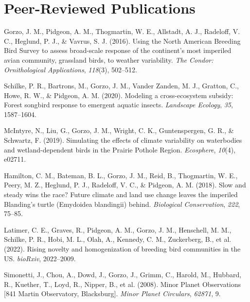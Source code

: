 \documentclass[11pt,a4paper,]{awesome-cv}
\newlength{\cslhangindent}
\newenvironment{CSLReferences}[2] %
 {\begin{list}{}{%
  \setlength{\itemindent}{0pt}
  \setlength{\leftmargin}{0pt}
  \setlength{\parsep}{0pt}
  \ifodd #1
   \setlength{\leftmargin}{\cslhangindent}
   \setlength{\itemindent}{-1\cslhangindent}
  \fi
  \setlength{\itemsep}{#2\baselineskip}}}
 {\end{list}}
\begin{document}
\section{Peer-Reviewed Publications}\label{peer-reviewed-publications}

\label{refs-ac9b1bd4beeebee61ed7fb33c33f685f}
\begin{CSLReferences}{1}{0}
Gorzo, J. M., Pidgeon, A. M., Thogmartin, W. E., Allstadt, A. J.,
Radeloff, V. C., Heglund, P. J., \& Vavrus, S. J. (2016). Using the
North American Breeding Bird Survey to assess broad-scale response of
the continent's most imperiled avian community, grassland birds, to
weather variability. \emph{The Condor: Ornithological Applications},
\emph{118}(3), 502--512.

Schilke, P. R., Bartrons, M., Gorzo, J. M., Vander Zanden, M. J.,
Gratton, C., Howe, R. W., \& Pidgeon, A. M. (2020). Modeling a
cross-ecosystem subsidy: Forest songbird response to emergent aquatic
insects. \emph{Landscape Ecology}, \emph{35}, 1587--1604.

McIntyre, N., Liu, G., Gorzo, J. M., Wright, C. K., Guntenspergen, G.
R., \& Schwartz, F. (2019). Simulating the effects of climate
variability on waterbodies and wetland-dependent birds in the Prairie
Pothole Region. \emph{Ecosphere}, \emph{10}(4), e02711.

Hamilton, C. M., Bateman, B. L., Gorzo, J. M., Reid, B., Thogmartin, W.
E., Peery, M. Z., Heglund, P. J., Radeloff, V. C., \& Pidgeon, A. M.
(2018). Slow and steady wins the race? Future climate and land use
change leaves the imperiled Blanding's turtle (Emydoidea blandingii)
behind. \emph{Biological Conservation}, \emph{222}, 75--85.

Latimer, C. E., Graves, R., Pidgeon, A. M., Gorzo, J. M., Henschell, M.
M., Schilke, P. R., Hobi, M. L., Olah, A., Kennedy, C. M., Zuckerberg,
B., et al. (2022). Rising novelty and homogenization of breeding bird
communities in the US. \emph{bioRxiv}, 2022--2009.

Simonetti, J., Chou, A., Dowd, J., Gorzo, J., Grimm, C., Harold, M.,
Hubbard, R., Kuether, T., Loyd, R., Nipper, B., et al. (2008). Minor
Planet Observations {[}841 Martin Observatory, Blacksburg{]}.
\emph{Minor Planet Circulars}, \emph{62871}, 9.

\end{CSLReferences}
\end{document}
